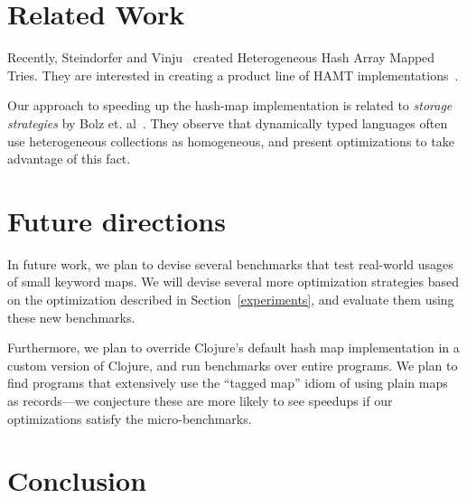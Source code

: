 \documentclass[preprint]{sigplanconf}
\begin{document}
\section{Related Work}

Recently, Steindorfer and Vinju~\cite{Steindorfer:2015:OHM:2814270.2814312}
created Heterogeneous Hash Array Mapped Tries.
They are interested in creating a product line of HAMT
implementations~\cite{Steindorfer:2016:TSP:2993236.2993251}.

Our approach to speeding up the hash-map implementation
is related to \textit{storage strategies}
by Bolz et. al~\cite{Bolz13storagestrategies}.
They observe that dynamically typed languages often use
heterogeneous collections as homogeneous, and present
optimizations to take advantage of this fact.



\section{Future directions}

In future work, we plan to devise several benchmarks
that test real-world usages of small keyword maps.
We will devise several more optimization strategies
based on the optimization described in Section~\ref{experiments},
and evaluate them using these new benchmarks.

Furthermore, we plan to override Clojure's default hash map implementation
in a custom version of Clojure, and run benchmarks
over entire programs.
We plan to find programs that extensively use the ``tagged map''
idiom of using plain maps as records---we conjecture these
are more likely to see speedups if our optimizations
satisfy the micro-benchmarks.

\section{Conclusion}

\end{document}
